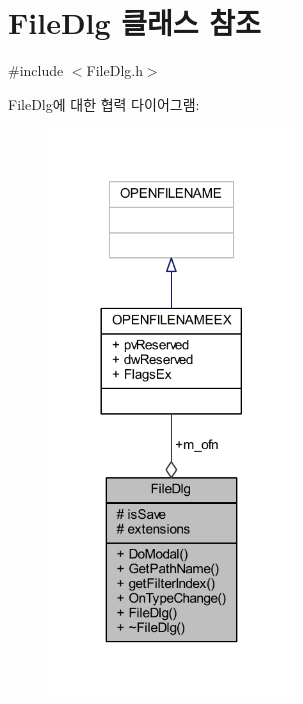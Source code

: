 \hypertarget{class_file_dlg}{}\section{File\+Dlg 클래스 참조}
\label{class_file_dlg}


{\ttfamily \#include $<$File\+Dlg.\+h$>$}



File\+Dlg에 대한 협력 다이어그램\+:\nopagebreak
\begin{figure}[H]
\begin{center}
\leavevmode
\includegraphics[width=185pt]{class_file_dlg__coll__graph}
\end{center}
\end{figure}
